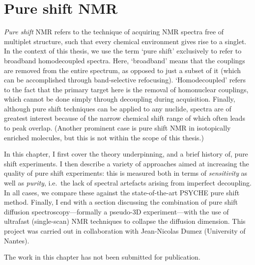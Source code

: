 \chapter{Pure shift NMR}
\label{chpt:pureshift}

\textit{Pure shift} NMR refers to the technique of acquiring NMR spectra free of multiplet structure, such that every chemical environment gives rise to a singlet.\autocite{Zangger2015PNMRS,Castanar2017MRC}
In the context of this thesis, we use the term `pure shift' exclusively to refer to broadband homodecoupled \proton{} spectra.
Here, `broadband' means that the couplings are removed from the entire spectrum, as opposed to just a subset of it (which can be accomplished through band-selective refocusing).
`Homodecoupled' refers to the fact that the primary target here is the removal of homonuclear couplings, which cannot be done simply through decoupling during acquisition.
Finally, although pure shift techniques can be applied to any nuclide, \proton{} spectra are of greatest interest because of the narrow chemical shift range of \proton{} which often leads to peak overlap.
(Another prominent case is \carbon{} pure shift NMR in isotopically enriched molecules, but this is not within the scope of this thesis.)

In this chapter, I first cover the theory underpinning, and a brief history of, pure shift experiments.
I then describe a variety of approaches aimed at increasing the quality of pure shift experiments: this is measured both in terms of \textit{sensitivity} as well as \textit{purity}, i.e.\ the lack of spectral artefacts arising from imperfect decoupling.
In all cases, we compare these against the state-of-the-art PSYCHE pure shift method\autocite{Foroozandeh2014ACIE,Foroozandeh2018CEJ}.
Finally, I end with a section discussing the combination of pure shift diffusion spectroscopy---formally a pseudo-3D experiment---with the use of ultrafast (single-scan) NMR techniques to collapse the diffusion dimension.
This project was carried out in collaboration with Jean-Nicolas Dumez (University of Nantes).

The work in this chapter has not been submitted for publication.









\printbibliography[heading=subbibnumbered]{}
